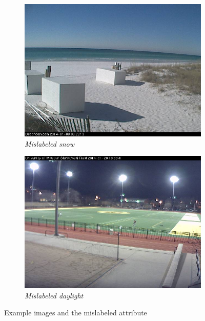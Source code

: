 \documentclass[10pt,twocolumn,letterpaper]{article}
\begin{document}
\begin{figure}
	\centering
  \begin{subfigure}[b]{0.49\columnwidth}
    \centering
		\includegraphics[width=\columnwidth]{figs/ex_bad_ims/snow_bad_1.jpg}
    \caption{\emph{Mislabeled \emph{snow}}}
    \label{fig:ex_bad_snow}
	\end{subfigure}	
  \begin{subfigure}[b]{0.49\columnwidth}
    \centering
		\includegraphics[width=\columnwidth]{figs/ex_bad_ims/daylight_bad_1.jpg}
    \caption{\emph{Mislabeled \emph{daylight}}}
    \label{fig:ex_bad_daylight}
	\end{subfigure}	
	\caption{Example images and the mislabeled attribute}
	\label{fig:ex_bad}
\end{figure}
\end{document}
